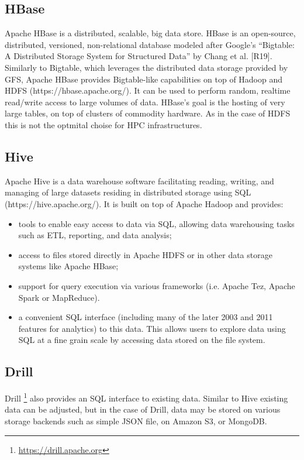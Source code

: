 \documentclass{../../template/esiwace-report}
\begin{document}
\subsection{HBase}
Apache HBase is a distributed, scalable, big data store. 
HBase is an open-source, distributed, versioned, non-relational database modeled after Google's “Bigtable: A Distributed Storage System for Structured Data” by Chang et al. [R19]. Similarly to Bigtable, which leverages the distributed data storage provided by GFS, Apache HBase provides Bigtable-like capabilities on top of Hadoop and HDFS (https://hbase.apache.org/).
It can be used to perform random, realtime read/write access to large volumes of data. HBase's goal is the hosting of very large tables, on top of clusters of commodity hardware. As in the case of HDFS this is not the optmital choise for HPC infrastructures.

\subsection{Hive}
Apache Hive is a data warehouse software facilitating reading, writing, and managing of large datasets residing in distributed storage using SQL (https://hive.apache.org/). It is built on top of Apache Hadoop and provides:
\begin{itemize}
\item tools to enable easy access to data via SQL, allowing data warehousing tasks such as ETL, reporting, and data analysis;
\item access to files stored directly in Apache HDFS or in other data storage systems like Apache HBase;
\item support for query execution via various frameworks (i.e. Apache Tez, Apache Spark or MapReduce).
\item a convenient SQL interface (including many of the later 2003 and 2011 features for analytics) to this data. This allows users to explore data using SQL at a fine grain scale by accessing data stored on the file system.
\end{itemize}

\subsection{Drill}
Drill \footnote{\url{https://drill.apache.org}} also provides an SQL interface to existing data.
Similar to Hive existing data can be adjusted, but in the case of Drill, data may be stored on various storage backends such as simple JSON file, on Amazon S3, or MongoDB.
\end{document}
